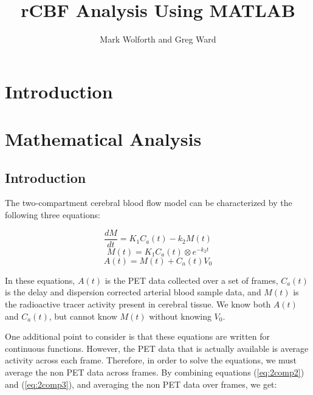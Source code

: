 
\title{rCBF Analysis Using MATLAB}
\author{Mark Wolforth and Greg Ward}

\def\code#1{{\tt #1}}



\maketitle
\newpage

\tableofcontents

\newpage
\section{Introduction}


\newpage
\section{Mathematical Analysis}

\subsection{Introduction}

The two-compartment cerebral blood flow model can be characterized by
the following three equations:

\begin{equation}
\frac{dM}{dt} = K_{1}C_{a}(t) - k_{2}M(t)      \label{eq:2comp1}
\end{equation}
\begin{equation}
M(t) = K_{1}C_{a}(t) \otimes e^{-k_{2}t}       \label{eq:2comp2}
\end{equation}
\begin{equation}
A(t) = M(t) + C_{a}(t)V_{0}                    \label{eq:2comp3}
\end{equation}

In these equations, $A(t)$ is the PET data collected over a set of
frames, $C_{a}(t)$ is the delay and dispersion corrected arterial
blood sample data, and $M(t)$ is the radioactive tracer activity
present in cerebral tissue.  We know both $A(t)$ and $C_{a}(t)$, but
cannot know $M(t)$ without knowing $V_{0}$.

One additional point to consider is that these equations are written
for continuous functions.  However, the PET data that is actually
available is average activity across each frame.  Therefore, in
order to solve the equations, we must average the non PET data
across frames.  By combining equations (\ref{eq:2comp2}) and
(\ref{eq:2comp3}), and averaging the non PET data over frames, we
get:

